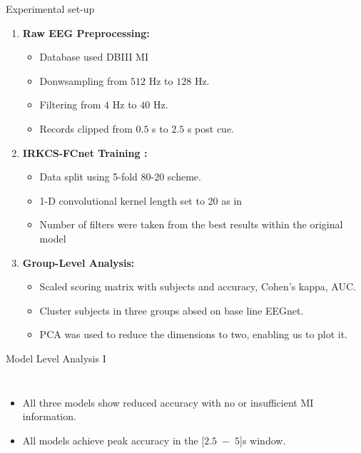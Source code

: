 \documentclass[aspectratio=169]{beamer}
\let\oldcite\cite %
\renewcommand{\cite}[1]{{\tiny\oldcite{#1}}}
\begin{document}
\begin{frame}{Experimental set-up}
    \begin{enumerate}
        \item \textbf{Raw EEG Preprocessing:} 
        \begin{itemize}
            \item Database used DBIII MI
            \item Donwsampling from $512$ Hz to $128$ Hz. 
            \item Filtering from $4$ Hz to $40$ Hz. 
            \item Records clipped from $0.5$ s to $2.5$ s post cue.
        \end{itemize}
        \item \textbf{IRKCS-FCnet Training \cite{lawhern2018eegnet, schirrmeister2017deep}:}
        \begin{itemize}
            \item Data split using 5-fold 80-20 scheme.
            \item 1-D convolutional kernel length set to $20$ as in \cite{lawhern2018eegnet}
            \item Number of filters were taken from the best results within the original model
        \end{itemize}
        \item \textbf{Group-Level Analysis:}
        \begin{itemize}
            \item Scaled scoring matrix with subjects and accuracy, Cohen's kappa, AUC.
            \item Cluster subjects in three groups absed on base line EEGnet.
            \item PCA was used to reduce the dimensions to two, enabling us to plot it.
        \end{itemize}
    \end{enumerate}
\end{frame}


\begin{frame}{Model Level Analysis I} 
    \begin{columns}
            \centering
            \resizebox{0.9\linewidth}{!}{}
            \begin{itemize}
                \item All three models show reduced accuracy with no or insufficient MI information.
                \item All models achieve peak accuracy in the [$2.5$~−~$5$]s window.
            \end{itemize}
    \end{columns}        
\end{frame}
\end{document}
